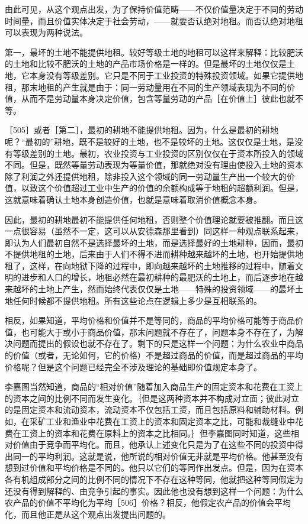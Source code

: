 由此可见，从这个观点出发，为了保持价值范畴——不仅价值量决定于不同的劳动时间量，而且价值实体决定于社会劳动，——就要否认绝对地租。而否认绝对地租可以表现为两种说法。

第一，最坏的土地不能提供地租。较好等级土地的地租可以这样来解释：比较肥沃的土地和比较不肥沃的土地的产品市场价格是一样的。但是最坏的土地仅仅是土地，它本身没有等级差别。它只是不同于工业投资的特殊投资领域。如果它提供地租，那末地租的产生就是由于：同一劳动量用在不同的生产领域表现为不同的价值，从而不是劳动量本身决定价值，包含等量劳动的产品［在价值上］彼此也就不等。

［505］或者［第二］，最初的耕地不能提供地租。因为，什么是最初的耕地呢？“最初的”耕地，既不是较好的土地，也不是较坏的土地。这仅仅是土地，是没有等级差别的土地。最初，农业投资与工业投资的区别仅仅在于资本所投入的领域不同。但是，既然等量劳动表现为等量价值，那就绝对没有理由使投入土地的资本除了利润之外还提供地租，除非投入这个领域的同一劳动量生产出一个较大的价值，以致这个价值超过工业中生产的价值的余额构成等于地租的超额利润。但是，这就意味着确认土地本身创造价值，也就是意味着取消价值概念本身。

因此，最初的耕地最初不能提供任何地租，否则整个价值理论就要被推翻。而且这一点很容易（虽然不一定，这可以从安德森那里看到）同这样一种观点联系起来，即认为人们最初自然不是选择最坏的土地，而是选择最好的土地耕种，因而，最初不提供地租的土地，后来由于人们不得不进而耕种越来越坏的土地，也开始提供地租了，这样，在向地狱下降的过程中，即向越来越坏的土地推移的过程中，随着文明的进步和人口的增长，地租必然在最初耕种的最肥沃的土地上，而后逐步地在越来越坏的土地上产生，然而始终代表仅仅是土地——特殊的投资领域——的最坏土地任何时候都不提供地租。所有这些论点在逻辑上多少是互相联系的。

相反，如果知道，平均价格和价值并不是等同的，商品的平均价格可能等于商品价值，也可能大于或小于商品价值，那末问题就不存在了，问题本身不存在了，为解决问题而提出的假设也就不存在了。剩下的只是这样一个问题：为什么农业中商品的价值（或者，无论如何，它的价格）不是超过商品的价值，而是超过商品的平均价格呢？但是这个问题已经完全不涉及理论的基础即价值规定本身了。

李嘉图当然知道，商品的“相对价值”随着加入商品生产的固定资本和花费在工资上的资本之间的比例不同而发生变化。｛但是这两种资本并不构成对立面；彼此对立的是固定资本和流动资本，流动资本不仅包括工资，而且包括原料和辅助材料。例如，在采矿工业和渔业中花费在工资上的资本和固定资本之比，可能和裁缝业中花费在工资上的资本和花费在原料上的资本之比相同。｝但李嘉图同时知道，这些相对价值由于竞争而平均化。而且，他承认上述变化只是为了在这些不同的投资中得出同一的平均利润。这就是说，他所说的相对价值无非就是平均价格。他甚至没有想到过价值和平均价格是不同的。他只以它们的等同作出发点。但是，因为在资本各有机组成部分之间的比例不同的情况下不存在这种等同，他就把这种等同假定为还没有得到解释的、由竞争引起的事实。因此他也没有想到这样一个问题：为什么农产品的价值不平均化为平均［506］价格？相反，他假定农产品的价值会平均化，而且他正是从这个观点出发提出问题的。

